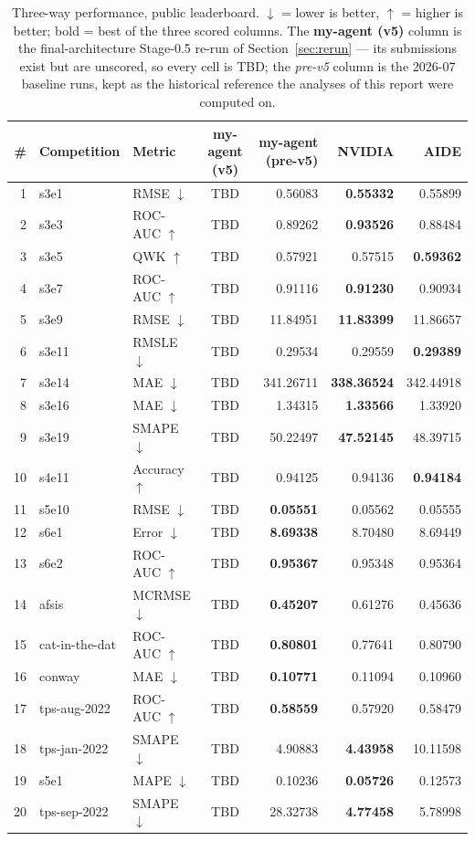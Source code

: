 \documentclass[11pt,a4paper]{article}
\newcommand{\dn}{\ensuremath{\downarrow}}
\newcommand{\up}{\ensuremath{\uparrow}}
\begin{document}
\begin{table}[htbp]
\centering\small
\caption{Three-way performance, public leaderboard. \dn{} = lower is better, \up{} = higher is better; bold = best of the three scored columns. The \textbf{my-agent (v5)} column is the final-architecture Stage-0.5 re-run of Section~\ref{sec:rerun} --- its submissions exist but are unscored, so every cell is TBD; the \emph{pre-v5} column is the 2026-07 baseline runs, kept as the historical reference the analyses of this report were computed on.}
\label{tab:public}
\begin{tabular}{@{}rllcrrr@{}}
\toprule
\# & \textbf{Competition} & \textbf{Metric} & \textbf{my-agent (v5)} & \textbf{my-agent (pre-v5)} & \textbf{NVIDIA} & \textbf{AIDE} \\
\midrule
1 & s3e1 & RMSE \dn & TBD & 0.56083 & \textbf{0.55332} & 0.55899 \\
2 & s3e3 & ROC-AUC \up & TBD & 0.89262 & \textbf{0.93526} & 0.88484 \\
3 & s3e5 & QWK \up & TBD & 0.57921 & 0.57515 & \textbf{0.59362} \\
4 & s3e7 & ROC-AUC \up & TBD & 0.91116 & \textbf{0.91230} & 0.90934 \\
5 & s3e9 & RMSE \dn & TBD & 11.84951 & \textbf{11.83399} & 11.86657 \\
6 & s3e11 & RMSLE \dn & TBD & 0.29534 & 0.29559 & \textbf{0.29389} \\
7 & s3e14 & MAE \dn & TBD & 341.26711 & \textbf{338.36524} & 342.44918 \\
8 & s3e16 & MAE \dn & TBD & 1.34315 & \textbf{1.33566} & 1.33920 \\
9 & s3e19 & SMAPE \dn & TBD & 50.22497 & \textbf{47.52145} & 48.39715 \\
10 & s4e11 & Accuracy \up & TBD & 0.94125 & 0.94136 & \textbf{0.94184} \\
11 & s5e10 & RMSE \dn & TBD & \textbf{0.05551} & 0.05562 & 0.05555 \\
12 & s6e1 & Error \dn & TBD & \textbf{8.69338} & 8.70480 & 8.69449 \\
13 & s6e2 & ROC-AUC \up & TBD & \textbf{0.95367} & 0.95348 & 0.95364 \\
14 & afsis & MCRMSE \dn & TBD & \textbf{0.45207} & 0.61276 & 0.45636 \\
15 & cat-in-the-dat & ROC-AUC \up & TBD & \textbf{0.80801} & 0.77641 & 0.80790 \\
16 & conway & MAE \dn & TBD & \textbf{0.10771} & 0.11094 & 0.10960 \\
17 & tps-aug-2022 & ROC-AUC \up & TBD & \textbf{0.58559} & 0.57920 & 0.58479 \\
18 & tps-jan-2022 & SMAPE \dn & TBD & 4.90883 & \textbf{4.43958} & 10.11598 \\
19 & s5e1 & MAPE \dn & TBD & 0.10236 & \textbf{0.05726} & 0.12573 \\
20 & tps-sep-2022 & SMAPE \dn & TBD & 28.32738 & \textbf{4.77458} & 5.78998 \\
\bottomrule
\end{tabular}
\end{table}
\end{document}
